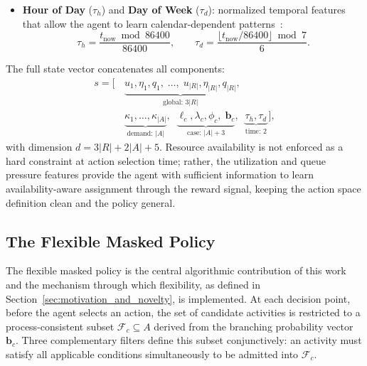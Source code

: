 \documentclass[journal,onecolumn]{IEEEtran}
\begin{document}
\begin{itemize}
    \item \textbf{Hour of Day} ($\tau_h$) and \textbf{Day of
    Week} ($\tau_d$): normalized temporal features that allow
    the agent to learn calendar-dependent
    patterns~\cite{Optimizing_Resource_Allocation_Policies}:
    \[
        \tau_h = \frac{t_{\text{now}} \bmod 86400}{86400},
        \qquad
        \tau_d = \frac{\lfloor t_{\text{now}} / 86400 \rfloor
        \bmod 7}{6}.
    \]
\end{itemize}

The full state vector concatenates all components:
\begin{align*}
    s = \big[\,
    &\underbrace{u_1, \eta_1, q_1,\; \dots,\;
    u_{|R|}, \eta_{|R|}, q_{|R|}}_{\text{global: } 3|R|}, \\
    &\underbrace{\kappa_1, \dots,
    \kappa_{|A|}}_{\text{demand: } |A|},\;\;
    \underbrace{\ell_c, \lambda_c, \phi_c,\;
    \mathbf{b}_c}_{\text{case: } |A|+3},\;\;
    \underbrace{\tau_h, \tau_d}_{\text{time: } 2}
    \,\big],
\end{align*}
with dimension $d = 3|R| + 2|A| + 5$. Resource availability is
not enforced as a hard constraint at action selection time;
rather, the utilization and queue pressure features provide the
agent with sufficient information to learn availability-aware
assignment through the reward signal, keeping the action space
definition clean and the policy general.



\subsection{The Flexible Masked Policy}
\label{subsec:mask}

The flexible masked policy is the central algorithmic contribution
of this work and the mechanism through which flexibility, as
defined in Section~\ref{sec:motivation_and_novelty}, is
implemented. At each decision point, before the agent selects an
action, the set of candidate activities is restricted to a
process-consistent subset $\mathcal{F}_c \subseteq A$ derived
from the branching probability vector $\mathbf{b}_c$. Three
complementary filters define this subset conjunctively: an
activity must satisfy all applicable conditions simultaneously
to be admitted into $\mathcal{F}_c$.
\end{document}
